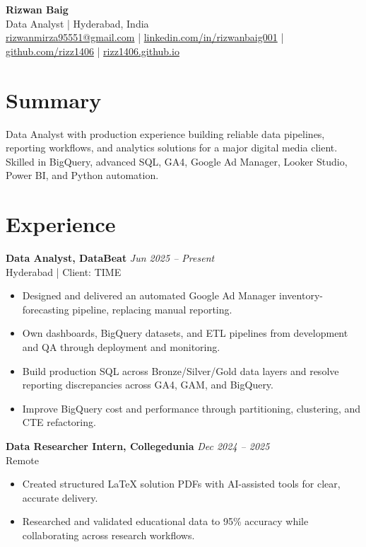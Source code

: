 \documentclass[10pt,a4paper]{article}
\begin{document}
{\LARGE\textbf{Rizwan Baig}}\\[-1pt]
Data Analyst | Hyderabad, India\\
\href{mailto:rizwanmirza95551@gmail.com}{rizwanmirza95551@gmail.com} \enspace|\enspace
\href{https://www.linkedin.com/in/rizwanbaig001/}{linkedin.com/in/rizwanbaig001} \enspace|\enspace
\href{https://github.com/rizz1406}{github.com/rizz1406} \enspace|\enspace
\href{https://rizz1406.github.io/}{rizz1406.github.io}

\section*{Summary}
Data Analyst with production experience building reliable data pipelines, reporting workflows, and analytics solutions for a major digital media client. Skilled in BigQuery, advanced SQL, GA4, Google Ad Manager, Looker Studio, Power BI, and Python automation.

\section*{Experience}
\textbf{Data Analyst, DataBeat} \hfill \textit{Jun 2025 -- Present}\\
Hyderabad | Client: TIME
\begin{itemize}
  \item Designed and delivered an automated Google Ad Manager inventory-forecasting pipeline, replacing manual reporting.
  \item Own dashboards, BigQuery datasets, and ETL pipelines from development and QA through deployment and monitoring.
  \item Build production SQL across Bronze/Silver/Gold data layers and resolve reporting discrepancies across GA4, GAM, and BigQuery.
  \item Improve BigQuery cost and performance through partitioning, clustering, and CTE refactoring.
\end{itemize}

\textbf{Data Researcher Intern, Collegedunia} \hfill \textit{Dec 2024 -- 2025}\\
Remote
\begin{itemize}
  \item Created structured LaTeX solution PDFs with AI-assisted tools for clear, accurate delivery.
  \item Researched and validated educational data to 95\% accuracy while collaborating across research workflows.
\end{itemize}
\end{document}
